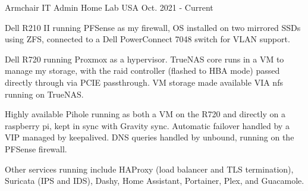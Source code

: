 \begin{cventries}
  \cventry
    {Armchair IT Admin} %
    {Home Lab} %
    {USA} %
    {Oct. 2021 - Current} %
    {
      \begin{cvitems} %
        \item {Dell R210 II running PFSense as my firewall, OS installed on two mirrored SSDs using ZFS, connected to a Dell PowerConnect 7048 switch for VLAN support.}
        \item {Dell R720 running Proxmox as a hypervisor. TrueNAS core runs in a VM to manage my storage, with the raid controller (flashed to HBA mode) passed directly through via PCIE passthrough. VM storage made available VIA nfs running on TrueNAS.}
        \item {Highly available Pihole running as both a VM on the R720 and directly on a raspberry pi, kept in sync with Gravity sync. Automatic failover handled by a VIP managed by keepalived. DNS queries handled by unbound, running on the PFSense firewall.}
        \item {Other services running include HAProxy (load balancer and TLS termination), Suricata (IPS and IDS), Dashy, Home Assistant, Portainer, Plex, and Guacamole.}
      \end{cvitems}
    }

\end{cventries}
